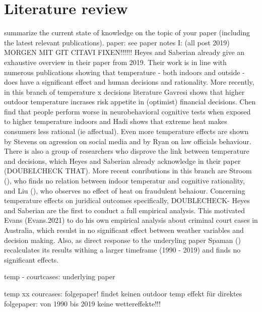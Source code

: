 \documentclass[11pt]{article}
\begin{document}
	\section{Literature review}
	summarize the current state of knowledge on the topic of your paper
	(including the latest relevant publications).
	paper: see paper notes 
	I: (all post 2019) 
	MORGEN MIT GIT CITAVI FIXEN!!!!!!\newline
	Heyes and Saberian already give an exhaustive overview in their paper from 2019. Their work is in line with numerous publications showing that temperature - both indoors and outside - does have a significant effect and human decisions and rationality. More recently, in this branch of temperature x decisions literature Gavresi \cite{Gavresi.2021} shows that higher outdoor temperature incrases risk appetite in (optimist) financial decisions. Chen \cite{Chen.2020} find that people perform worse in neurobehavioral cognitive tests when exposed to higher temperature indoors and Hadi \cite{Hadi.2019} shows that extreme heat makes consumers less rational (ie affectual). Even more temperature effects are shown by Stevens \cite{Stevens.2021} on agression on social media and by Ryan \cite{Ryan.2020} on law officials behaviour. \newline
	There is also a group of researchers who disprove the link between temperature and decisions, which Heyes and Saberian already acknowledge in their paper (DOUBELCHECK THAT). More recent conributions in this branch are Stroom (\cite{Stroom.2021}), who finds no relation between indoor temperatur and cognitive rationality, and Liu (\cite{Liu.2020}), who observes no effect of heat on fraudulent behaiour. \newline
	Concerning temperature effects on juridical outcomes specifically, DOUBLECHECK- Heyes and Saberian are the first to conduct a full empirical analysis. This motivated Evans ({Evans.2021}) to do his own empirical analysis about criminal court cases in Australia, which resulst in no significant effect between weather variables and decision making. Also, as direct response to the underyling paper Spaman (\cite{Spamann.2020}) recalculates its results withing a larger timeframe (1990 - 2019) and finds no significant effects.
	
	
	temp - courtcases:
	\cite{Heyes.2019} underlying paper
	
	temp xx courcases:
	\cite{Evans.2021} folgepaper! findet keinen outdoor temp effekt für
	\cite{Spamann.2020} \newline direktes folgepaper: von 1990 bis 2019 keine wettereffekte!!!
	
\end{document}
